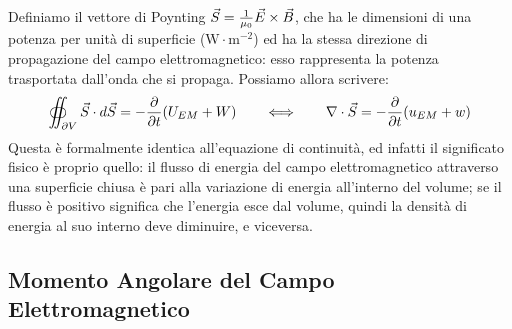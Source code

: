 Definiamo il vettore di Poynting $ \vec{S} = \frac{1}{\mu_0}\vec{E}\times\vec{B} $, che ha le dimensioni di una potenza per unità di superficie ($ \text{W}\cdot\text{m}^{-2} $) ed ha la stessa direzione di propagazione del campo elettromagnetico: esso rappresenta la potenza trasportata dall'onda che si propaga. Possiamo allora scrivere:
\begin{equation}
	\oiint_{\partial V} \vec{S}\cdot d\vec{S} = -\frac{\partial}{\partial t}(U_{EM} + W) \qquad\Longleftrightarrow\qquad \nabla\cdot\vec{S} = -\frac{\partial}{\partial t} (u_{EM} + w)
	\label{eq:34}
\end{equation}
Questa è formalmente identica all'equazione di continuità, ed infatti il significato fisico è proprio quello: il flusso di energia del campo elettromagnetico attraverso una superficie chiusa è pari alla variazione di energia all'interno del volume; se il flusso è positivo significa che l'energia esce dal volume, quindi la densità di energia al suo interno deve diminuire, e viceversa.

\subsection{Momento Angolare del Campo Elettromagnetico}

